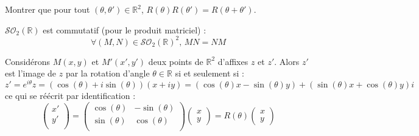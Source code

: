 \documentclass[french,11pt,twoside]{VcCours}
\begin{document}
\begin{ApplicationDirecte}{} Montrer que pour tout $(\theta, \theta') \in \mathbb{R}^2$, $R(\theta) R(\theta') = R(\theta + \theta')$.
\end{ApplicationDirecte}

\begin{Proposition}{} $\mathcal{SO}_2(\mathbb{R})$ est commutatif (pour le produit matriciel) : 
$$ \forall (M,N) \in \mathcal{SO}_2(\mathbb{R})^2, \,  MN=NM$$
\end{Proposition}

\begin{Demonstration}{}
\vspace*{3cm}
\end{Demonstration}

\begin{Remarque}{} Considérons $M(x,y)$ et $M'(x',y')$ deux points de $\mathbb{R}^2$ d'affixes $z$ et $z'$. Alors $z'$ est l'image de $z$ par la rotation d'angle $\theta \in \mathbb{R}$ si et seulement si :
$$z'= e^{i \theta } z = (\cos(\theta) + i \sin(\theta))(x+iy) = (\cos(\theta) x- \sin(\theta)y) + (\sin(\theta)x+ \cos(\theta)y)i$$
ce qui se réécrit par identification :
$$ \begin{pmatrix}
x'\\
y' \\
\end{pmatrix} = \begin{pmatrix}
\cos(\theta) & - \sin(\theta) \\
\sin(\theta) & \cos(\theta) \\
\end{pmatrix} \begin{pmatrix}
x \\
y
\end{pmatrix} = R(\theta) \begin{pmatrix}
x \\
y
\end{pmatrix}$$
\end{Remarque}
\end{document}
